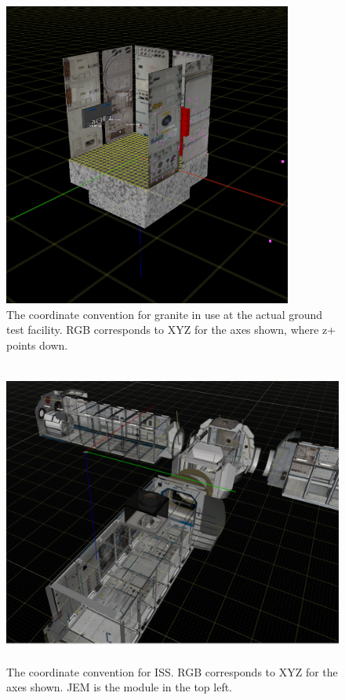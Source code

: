 \documentclass{article}
\begin{document}
\begin{figure}[h!]
    \centering
    \includegraphics[height=10cm]{img/sim_axes.png}
    \caption{The coordinate convention for granite in use at the actual ground test facility. RGB corresponds to XYZ for the axes shown, where z+ points down.}
    \label{fig:sim_axes}
\end{figure}
\begin{figure}[h!]
    \centering
    \includegraphics[height=10cm]{img/ISS_frame.png}
    \caption{The coordinate convention for ISS. RGB corresponds to XYZ for the axes shown. JEM is the module in the top left.}
    \label{fig:sim_axes_iss}
\end{figure}
\end{document}
